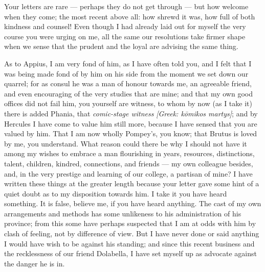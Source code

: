 

 Your letters are rare --- perhaps they do not get through --- but how welcome when they come; the most recent above all: how shrewd it was, how full of both kindness and counsel! Even though I had already laid out for myself the very course you were urging on me, all the same our resolutions take firmer shape when we sense that the prudent and the loyal are advising the same thing.

 As to Appius, I am very fond of him, as I have often told you, and I felt that I was being made fond of by him on his side from the moment we set down our quarrel; for as consul he was a man of honour towards me, an agreeable friend, and even encouraging of the very studies that are mine; and that my own good offices did not fail him, you yourself are witness, to whom by now (as I take it) there is added Phania, that \textit{comic-stage witness} \textit{[Greek: k\=omikos martys]}; and by Hercules I have come to value him still more, because I have sensed that you are valued by him. That I am now wholly Pompey's, you know; that Brutus is loved by me, you understand. What reason could there be why I should not have it among my wishes to embrace a man flourishing in years, resources, distinctions, talent, children, kindred, connections, and friends --- my own colleague besides, and, in the very prestige and learning of our college, a partisan of mine? I have written these things at the greater length because your letter gave some hint of a quiet doubt as to my disposition towards him. I take it you have heard something. It is false, believe me, if you have heard anything. The cast of my own arrangements and methods has some unlikeness to his administration of his province; from this some have perhaps suspected that I am at odds with him by clash of feeling, not by difference of view. But I have never done or said anything I would have wish to be against his standing; and since this recent business and the recklessness of our friend Dolabella, I have set myself up as advocate against the danger he is in.

